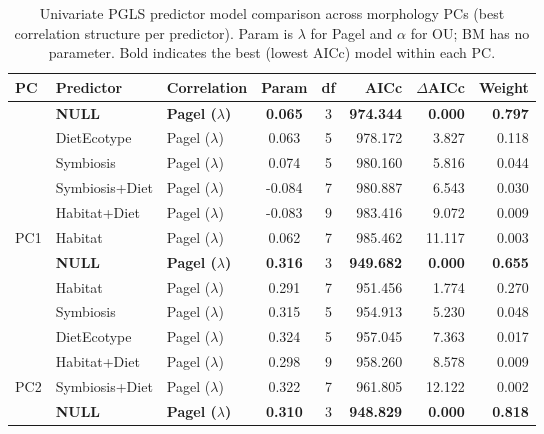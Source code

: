 \begin{table}[!h]
\centering
\caption{\label{tab:tab:color_pred_model_comparison_combined}Univariate PGLS predictor model comparison across morphology PCs (best correlation structure per predictor). Param is $\lambda$ for Pagel and $\alpha$ for OU; BM has no parameter. Bold indicates the best (lowest AICc) model within each PC.}
\centering
\begin{tabular}[t]{lllccrrr}
\toprule
PC & Predictor & Correlation & Param & df & AICc & $\Delta$AICc & Weight\\
\midrule
 & \textbf{NULL} & \textbf{Pagel ($\lambda$)} & \textbf{0.065} & 3 & \textbf{974.344} & \textbf{0.000} & \textbf{0.797}\\

 & DietEcotype & Pagel ($\lambda$) & 0.063 & 5 & 978.172 & 3.827 & 0.118\\

 & Symbiosis & Pagel ($\lambda$) & 0.074 & 5 & 980.160 & 5.816 & 0.044\\

 & Symbiosis+Diet & Pagel ($\lambda$) & -0.084 & 7 & 980.887 & 6.543 & 0.030\\

 & Habitat+Diet & Pagel ($\lambda$) & -0.083 & 9 & 983.416 & 9.072 & 0.009\\

\multirow{-6}{*}{\raggedright\arraybackslash PC1} & Habitat & Pagel ($\lambda$) & 0.062 & 7 & 985.462 & 11.117 & 0.003\\
\cmidrule{1-8}
 & \textbf{NULL} & \textbf{Pagel ($\lambda$)} & \textbf{0.316} & 3 & \textbf{949.682} & \textbf{0.000} & \textbf{0.655}\\

 & Habitat & Pagel ($\lambda$) & 0.291 & 7 & 951.456 & 1.774 & 0.270\\

 & Symbiosis & Pagel ($\lambda$) & 0.315 & 5 & 954.913 & 5.230 & 0.048\\

 & DietEcotype & Pagel ($\lambda$) & 0.324 & 5 & 957.045 & 7.363 & 0.017\\

 & Habitat+Diet & Pagel ($\lambda$) & 0.298 & 9 & 958.260 & 8.578 & 0.009\\

\multirow{-6}{*}{\raggedright\arraybackslash PC2} & Symbiosis+Diet & Pagel ($\lambda$) & 0.322 & 7 & 961.805 & 12.122 & 0.002\\
\cmidrule{1-8}
 & \textbf{NULL} & \textbf{Pagel ($\lambda$)} & \textbf{0.310} & 3 & \textbf{948.829} & \textbf{0.000} & \textbf{0.818}\\


\end{tabular}
\end{table}
